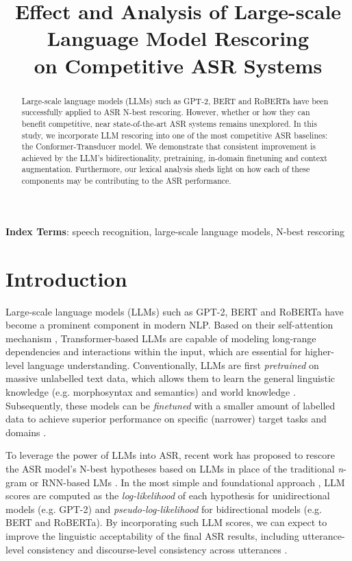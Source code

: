 \documentclass[a4paper]{article}
\title{Effect and Analysis of Large-scale Language Model Rescoring \\on Competitive ASR Systems}
\begin{document}
\maketitle
% 
\begin{abstract}
Large-scale language models (LLMs) such as GPT-2, BERT and RoBERTa have been successfully applied to ASR N-best rescoring. However, whether or how they can benefit competitive, near state-of-the-art ASR systems remains unexplored. In this study, we incorporate LLM rescoring into one of the most competitive ASR baselines: the Conformer-Transducer model. We demonstrate that consistent improvement is achieved by the LLM's bidirectionality, pretraining, in-domain finetuning and context augmentation. Furthermore, our lexical analysis sheds light on how each of these components may be contributing to the ASR performance.

\end{abstract}
\noindent\textbf{Index Terms}: speech recognition, large-scale language models, N-best rescoring

\section{Introduction}
\label{sec:introduction}

Large-scale language models (LLMs) such as GPT-2, BERT and RoBERTa \cite{radford2019language,devlin-etal-2019-bert,liu2019roberta} have become a prominent component in modern NLP. Based on their self-attention mechanism \cite{vaswani2017attention}, Transformer-based LLMs are capable of modeling long-range dependencies and interactions within the input, which are essential for higher-level language understanding. Conventionally, LLMs are first \textit{pretrained} on massive unlabelled text data, which allows them to learn the general linguistic knowledge (e.g. morphosyntax and semantics) \cite{tenney-etal-2019-bert,Tenney2019What} and world knowledge \cite{petroni-etal-2019-language}. Subsequently, these models can be \textit{finetuned} with a smaller amount of labelled data to achieve superior performance on specific (narrower) target tasks and domains \cite{ruder2021lmfine-tuning}.

To leverage the power of LLMs into ASR, recent work has proposed to rescore the ASR model's N-best hypotheses based on LLMs \cite{shin2019effective,salazar-etal-2020-masked,Li2020AnES,Chiu2021InnovativeBR,Zheng2021AdaptingGG,futami2021rescoring,xu2022rescorebert} in place of the traditional \textit{n}-gram or RNN-based LMs \cite{Rosenfeld2000TwoDO,Mikolov2010RecurrentNN,arisoy2015bidirectional}. In the most simple and foundational approach \cite{shin2019effective,salazar-etal-2020-masked}, LLM scores are computed as the \textit{log-likelihood} of each hypothesis for unidirectional models (e.g. GPT-2) and \textit{pseudo-log-likelihood} for bidirectional models (e.g. BERT and RoBERTa). By incorporating such LLM scores, we can expect to improve the linguistic acceptability of the final ASR results, including utterance-level consistency and discourse-level consistency across utterances \cite{xiong-etal-2018-session,Irie2019TrainingLM}.
\end{document}
